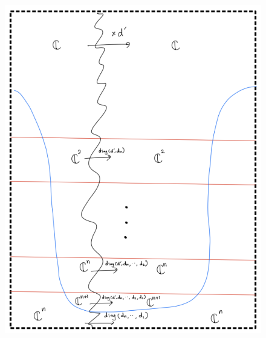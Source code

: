 \begin{enumerate}[label = (\roman*)]
\begin{enumerate}[label = (Step \arabic*)]
\begin{figure}[H]
    \centering
    \includegraphics[scale = 0.95]{diagrams/cobord5/7.png}
    \caption{}
    \label{fig:your-label}
\end{figure}
\end{enumerate}
\end{enumerate}